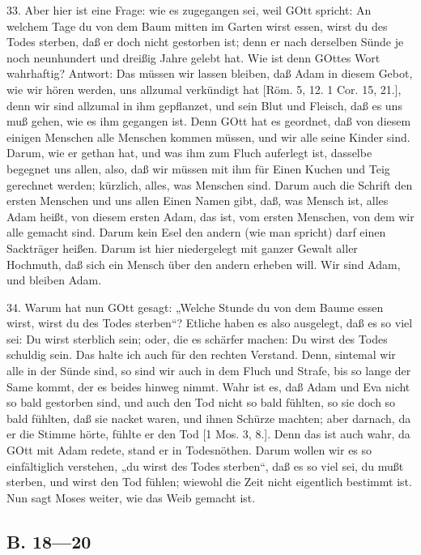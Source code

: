 33. Aber hier ist eine Frage: wie es zugegangen sei, weil GOtt spricht: An welchem Tage du von dem Baum mitten im Garten wirst essen, wirst du des Todes sterben, daß er doch nicht gestorben ist; denn er nach derselben Sünde je noch neunhundert und dreißig Jahre gelebt hat. Wie ist denn GOttes Wort wahrhaftig? Antwort: Das müssen wir lassen bleiben, daß Adam in diesem Gebot, wie wir hören werden, uns allzumal verkündigt hat [Röm. 5, 12. 1 Cor. 15, 21.], denn wir sind allzumal in ihm gepflanzet, und sein Blut und Fleisch, daß es uns muß gehen, wie es ihm gegangen ist. Denn GOtt hat es geordnet, daß von diesem einigen Menschen alle Menschen kommen müssen, und wir alle seine Kinder sind. Darum, wie er gethan hat, und was ihm zum Fluch auferlegt ist, dasselbe begegnet uns allen, also, daß wir müssen mit ihm für Einen Kuchen und Teig gerechnet werden; kürzlich, alles, was Menschen sind. Darum auch die Schrift den ersten Menschen und uns allen Einen Namen gibt, daß, was Mensch ist, alles Adam heißt, von diesem ersten Adam, das ist, vom ersten Menschen, von dem wir alle gemacht sind. Darum kein Esel den andern (wie man spricht) darf einen Sackträger heißen. Darum ist hier niedergelegt mit ganzer Gewalt aller Hochmuth, daß sich ein Mensch über den andern erheben will. Wir sind Adam, und bleiben Adam.

34. Warum hat nun GOtt gesagt: „Welche Stunde du von dem Baume essen wirst, wirst du des Todes sterben“? Etliche haben es also ausgelegt, daß es so viel sei: Du wirst sterblich sein; oder, die es schärfer machen: Du wirst des Todes schuldig sein. Das halte ich auch für den rechten Verstand. Denn, sintemal wir alle in der Sünde sind, so sind wir auch in dem Fluch und Strafe, bis so lange der Same kommt, der es beides hinweg nimmt. Wahr ist es, daß Adam und Eva nicht so bald gestorben sind, und auch den Tod nicht so bald fühlten, so sie doch so bald fühlten, daß sie nacket waren, und ihnen Schürze machten; aber darnach, da er die Stimme hörte, fühlte er den Tod [1 Mos. 3, 8.]. Denn das ist auch wahr, da GOtt mit Adam redete, stand er in Todesnöthen. Darum wollen wir es so einfältiglich verstehen, „du wirst des Todes sterben“, daß es so viel sei, du mußt sterben, und wirst den Tod fühlen; wiewohl die Zeit nicht eigentlich bestimmt ist. Nun sagt Moses weiter, wie das Weib gemacht ist.

\subsection[B. 18—20]{B. 18—20}

